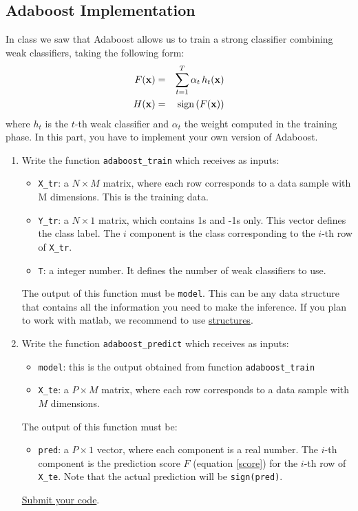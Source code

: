 \subsection{Adaboost Implementation}

In class we saw that Adaboost allows us to train a strong classifier combining weak classifiers, taking the following form:
\begin{eqnarray}
    F({\bf x}) & = & \sum_{t=1}^T \alpha_t \, h_t({\bf x}) \label{score}\\
    H({\bf x}) & = & \text{sign} \left( F({\bf x}) \right)
\end{eqnarray}
where $h_t$ is the $t$-th weak classifier and $\alpha_t$ the weight computed in the training phase. In this part, you have to implement your own version of Adaboost.
\begin{enumerate}
    \item Write the function \texttt{adaboost\_train} which receives as inputs:
    \begin{itemize}
        \item \texttt{X\_tr}: a $N \times M$ matrix, where each row corresponds to a data sample with M dimensions. This is the training data.
        \item \texttt{Y\_tr}: a $N  \times 1$ matrix, which contains 1s and -1s only. This vector defines the class label. The $i$ component is the class corresponding to the $i$-th row of \texttt{X\_tr}.
        \item \texttt{T}: a integer number. It defines the number of weak classifiers to use.
    \end{itemize}
    The output of this function must be \texttt{model}. This can be any data structure that contains all the information you need to make the inference. If you plan to work with matlab, we recommend to use \href{https://www.mathworks.com/help/matlab/structures.html}{structures}.
    
    \item Write the function \texttt{adaboost\_predict} which receives as inputs:
    \begin{itemize}
        \item \texttt{model}: this is the output obtained from function \texttt{adaboost\_train}
        \item \texttt{X\_te}: a $P \times M$ matrix, where each row corresponds to a data sample with $M$ dimensions.
    \end{itemize}
    The output of this function must be:
    \begin{itemize}
        \item \texttt{pred}: a $P \times 1$ vector, where each component is a real number. The $i$-th component is the prediction score $F$ (equation \ref{score}) for the $i$-th row of \texttt{X\_te}. Note that the actual prediction will be \texttt{sign(pred)}.
    \end{itemize}
    \ul{Submit your code}.
\end{enumerate}


